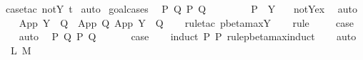 \begin{isabellebody}
\isamarkupfalse%
\ {\isacharparenleft}case{\isacharunderscore}tac\ {\isachardoublequoteopen}not{\isacharunderscore}Y\ t{}{\isachardoublequoteclose}{\isacharparenright}\isanewline
{}\isamarkupfalse%
\ auto{\isacharbrackleft}{}{\isacharbrackright}\isanewline
{}\isamarkupfalse%
\ goal{\isacharunderscore}cases\isanewline
{}\isamarkupfalse%
\ {\isacharparenleft}{}\ P\ Q\ P{\isacharprime}\ Q{\isacharprime}{\isacharparenright}\isanewline
\ \ \isamarkupfalse%
\ \isamarkupfalse%
\ {\isasymsigma}\ \ {}{\isacharcolon}\ {\isachardoublequoteopen}P\ {\isacharequal}\ Y\ {\isasymsigma}{\isachardoublequoteclose}\ \isamarkupfalse%
\ not{\isacharunderscore}Y{\isacharunderscore}ex\ \isamarkupfalse%
\ auto\isanewline
\ \ \isamarkupfalse%
\ {\isachardoublequoteopen}App\ {\isacharparenleft}Y\ {\isasymsigma}{\isacharparenright}\ Q\ {\isachargreater}{\isachargreater}{\isachargreater}\ App\ Q{\isacharprime}\ {\isacharparenleft}App\ {\isacharparenleft}Y\ {\isasymsigma}{\isacharparenright}\ Q{\isacharprime}{\isacharparenright}{\isachardoublequoteclose}\isanewline
\ \ \isamarkupfalse%
\ {\isacharparenleft}rule{\isacharunderscore}tac\ pbeta{\isacharunderscore}max{\isachardot}Y{\isacharparenright}\isanewline
\ \ \isamarkupfalse%
\ {\isacharparenleft}rule\ {}{\isacharparenleft}{}{\isacharparenright}{\isacharparenright}\isanewline
\ \ \isamarkupfalse%
\ {\isacharquery}case\ \isamarkupfalse%
\ {}\ \isamarkupfalse%
\ auto\isanewline
{}\isamarkupfalse%
\isanewline
{}\isamarkupfalse%
\ {\isacharparenleft}{}\ P\ Q\ P{\isacharprime}\ Q{\isacharprime}{\isacharparenright}\isanewline
\ \ \isamarkupfalse%
\ {}{\isacharparenleft}{}{\isacharcomma}{}{\isacharcomma}{}{\isacharcomma}{}{\isacharcomma}{}{\isacharparenright}\ \isamarkupfalse%
\ {\isacharquery}case\isanewline
\ \ \isamarkupfalse%
\ {\isacharparenleft}induct\ P\ P{\isacharprime}\ rule{\isacharcolon}pbeta{\isacharunderscore}max{\isachardot}induct{\isacharparenright}\isanewline
\ \ \isamarkupfalse%
\ auto\isanewline
{}\isamarkupfalse%
\isanewline
{}\isamarkupfalse%
\ {\isacharparenleft}{}\ L\ M{\isacharparenright}\isanewline

\end{isabellebody}
